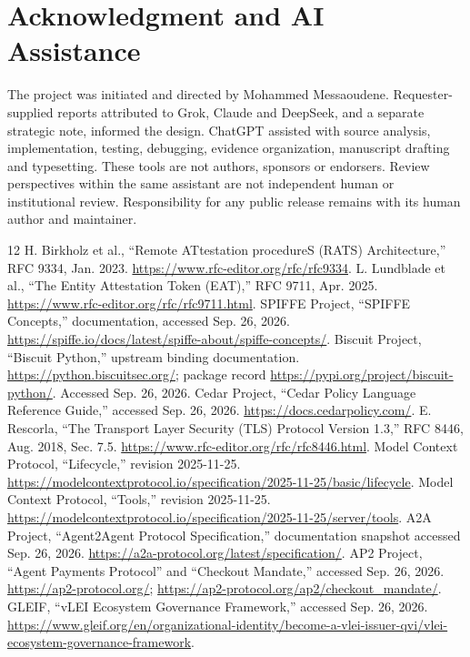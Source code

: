 \documentclass[journal,10pt]{IEEEtran}
\begin{document}
\balance
\section*{Acknowledgment and AI Assistance}
The project was initiated and directed by Mohammed Messaoudene. Requester-supplied reports attributed to Grok, Claude and DeepSeek, and a separate strategic note, informed the design. ChatGPT assisted with source analysis, implementation, testing, debugging, evidence organization, manuscript drafting and typesetting. These tools are not authors, sponsors or endorsers. Review perspectives within the same assistant are not independent human or institutional review. Responsibility for any public release remains with its human author and maintainer.

\begin{thebibliography}{12}
 H. Birkholz et al., ``Remote ATtestation procedureS (RATS) Architecture,'' RFC 9334, Jan. 2023. \url{https://www.rfc-editor.org/rfc/rfc9334}.
 L. Lundblade et al., ``The Entity Attestation Token (EAT),'' RFC 9711, Apr. 2025. \url{https://www.rfc-editor.org/rfc/rfc9711.html}.
 SPIFFE Project, ``SPIFFE Concepts,'' documentation, accessed Sep. 26, 2026. \url{https://spiffe.io/docs/latest/spiffe-about/spiffe-concepts/}.
 Biscuit Project, ``Biscuit Python,'' upstream binding documentation. \url{https://python.biscuitsec.org/}; package record \url{https://pypi.org/project/biscuit-python/}. Accessed Sep. 26, 2026.
 Cedar Project, ``Cedar Policy Language Reference Guide,'' accessed Sep. 26, 2026. \url{https://docs.cedarpolicy.com/}.
 E. Rescorla, ``The Transport Layer Security (TLS) Protocol Version 1.3,'' RFC 8446, Aug. 2018, Sec. 7.5. \url{https://www.rfc-editor.org/rfc/rfc8446.html}.
 Model Context Protocol, ``Lifecycle,'' revision 2025-11-25. \url{https://modelcontextprotocol.io/specification/2025-11-25/basic/lifecycle}.
 Model Context Protocol, ``Tools,'' revision 2025-11-25. \url{https://modelcontextprotocol.io/specification/2025-11-25/server/tools}.
 A2A Project, ``Agent2Agent Protocol Specification,'' documentation snapshot accessed Sep. 26, 2026. \url{https://a2a-protocol.org/latest/specification/}.
 AP2 Project, ``Agent Payments Protocol'' and ``Checkout Mandate,'' accessed Sep. 26, 2026. \url{https://ap2-protocol.org/}; \url{https://ap2-protocol.org/ap2/checkout_mandate/}.
 GLEIF, ``vLEI Ecosystem Governance Framework,'' accessed Sep. 26, 2026. \url{https://www.gleif.org/en/organizational-identity/become-a-vlei-issuer-qvi/vlei-ecosystem-governance-framework}.
\end{thebibliography}
\end{document}
